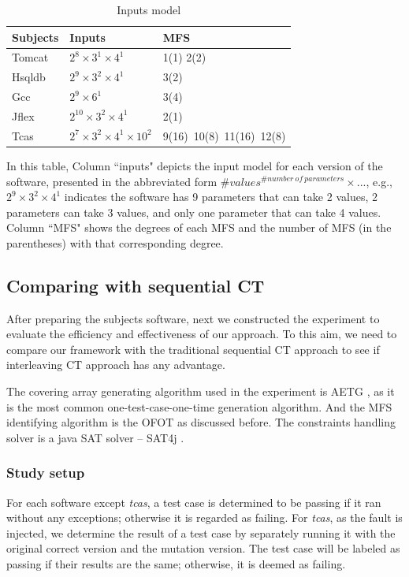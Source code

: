 \documentclass{sig-alternate}
\begin{document}
\begin{table}[ht]
\caption{Inputs model }
\label{inputs}
\center
\begin{tabular}{l|l|l}
\hline
Subjects & Inputs & MFS \\
\hline
Tomcat   &  $2^{8} \times 3^{1} \times 4^{1}$       & 1(1) 2(2)  \\
Hsqldb   &   $2^{9} \times 3^{2} \times 4^{1}$      &  3(2) \\
Gcc      &   $2^{9} \times 6^{1}$      &    3(4)  \\
Jflex    & $2^{10} \times 3^{2} \times 4^{1} $        &   2(1)   \\
Tcas     &  $2^{7} \times 3^{2} \times 4^{1} \times 10^{2} $ &9(16)\ 10(8)\ 11(16)\ 12(8) \\ \hline
\end{tabular}

\end{table}
In this table, Column ``inputs" depicts the input model for each version of the software, presented in the abbreviated form $\#values^{\#number\ of\ parameters} \times ...$, e.g., $2^{9} \times 3^{2} \times 4^{1}$ indicates the software has 9 parameters that can take 2 values, 2 parameters can take 3 values, and only one parameter that can take 4 values. Column ``MFS" shows the degrees of each MFS and the number of MFS (in the parentheses) with that corresponding degree.

\subsection{Comparing with sequential CT}

After preparing the subjects software, next we constructed the experiment to evaluate the efficiency and effectiveness of our approach. To this aim, we need to compare our framework with the traditional sequential CT approach to see if interleaving CT approach has any advantage.

The covering array generating algorithm used in the experiment is AETG \cite{cohen1997aetg}, as it is the most common one-test-case-one-time generation algorithm. And the MFS identifying algorithm is the OFOT \cite{nie2011minimal} as discussed before. The constraints handling solver is a java SAT solver -- SAT4j \cite{le2010sat4j}.


\subsubsection{Study setup}
For each software except \emph{tcas}, a test case is determined to be passing if it ran without any exceptions; otherwise it is regarded as failing. For \emph{tcas}, as the fault is injected, we determine the result of a test case by separately running it with the original correct version and the mutation version. The test case will be labeled as passing if their results are the same; otherwise, it is deemed as failing.
\end{document}
